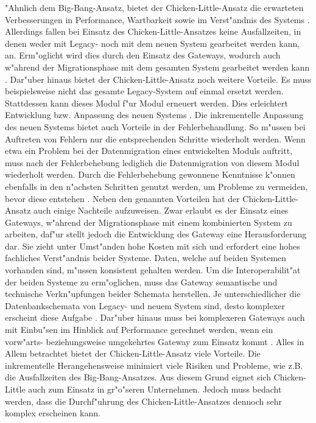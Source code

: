 \lb
"Ahnlich dem Big-Bang-Ansatz, bietet der Chicken-Little-Ansatz die erwarteten Verbesserungen in Performance, Wartbarkeit sowie im Verst"andnis des Systems \citep[S.~108]{bisbal-1999}. Allerdings fallen bei Einsatz des Chicken-Little-Ansatzes keine Ausfallzeiten, in denen weder mit Legacy- noch mit dem neuen System gearbeitet werden kann, an. Erm"oglicht wird dies durch den Einsatz des Gateways, wodurch auch w"ahrend der Migrationsphase mit dem gesamten System gearbeitet werden kann \citep[S.~2]{wuLawless-1997}. Dar"uber hinaus bietet der Chicken-Little-Ansatz noch weitere Vorteile. Es muss beispielsweise nicht das gesamte Legacy-System auf einmal ersetzt werden. Stattdessen kann dieses Modul f"ur Modul erneuert werden. Dies erleichtert Entwicklung bzw. Anpassung des neuen Systems \citep[S.~3]{brodie-1993}. Die inkrementelle Anpassung des neuen Systems bietet auch Vorteile in der Fehlerbehandlung. So m"ussen bei Auftreten von Fehlern nur die entsprechenden Schritte wiederholt werden. Wenn etwa ein Problem bei der Datenmigration eines entwickelten Moduls auftritt, muss nach der Fehlerbehebung lediglich die Datenmigration von diesem Modul wiederholt werden. Durch die Fehlerbehebung gewonnene Kenntnisse k"onnen ebenfalls in den n"achsten Schritten genutzt werden, um Probleme zu vermeiden, bevor diese entstehen \citep[S.~3]{brodie-1993}.
\lb
Neben den genannten Vorteilen hat der Chicken-Little-Ansatz auch einige Nachteile aufzuweisen. Zwar erlaubt es der Einsatz eines Gateways, w"ahrend der Migrationsphase mit einem kombinierten System zu arbeiten, daf"ur stellt jedoch die Entwicklung des Gateway eine Herausforderung dar. Sie zieht unter Umst"anden hohe Kosten mit sich und erfordert eine hohes fachliches Verst"andnis beider Systeme. Daten, welche auf beiden Systemen vorhanden sind, m"ussen konsistent gehalten werden. Um die Interoperabilit"at der beiden Systeme zu erm"oglichen, muss das Gateway semantische und technische Verkn"upfungen beider Schemata herstellen. Je unterschiedlicher die Datenbankschemata von Legacy- und neuem System sind, desto komplexer erscheint diese Aufgabe \citep[S.~2f.]{wuLawless-1997}. Dar"uber hinaus muss bei komplexeren Gateways auch mit Einbu"sen im Hinblick auf Performance gerechnet werden, wenn ein vorw"arts- beziehungsweise umgekehrtes Gateway zum Einsatz kommt \citep[S.~109]{bisbal-1999}.
\lb
Alles in Allem betrachtet bietet der Chicken-Little-Ansatz viele Vorteile. Die inkrementelle Herangehensweise minimiert viele Risiken und Probleme, wie z.B. die Ausfallzeiten des Big-Bang-Ansatzes. Aus diesem Grund eignet sich Chicken-Little auch zum Einsatz in gr"o"seren Unternehmen. Jedoch muss bedacht werden, dass die Durchf"uhrung des Chicken-Little-Ansatzes dennoch sehr komplex erscheinen kann.

